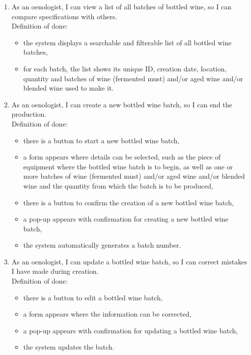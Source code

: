 \begin{enumerate}
	\item As an oenologist, I can view a list of all batches of bottled wine, so I can compare specifications with others.
	\\Definition of done:
	\begin{itemize}
		\item the system displays a searchable and filterable list of all bottled wine batches,
		\item for each batch, the list shows its unique ID, creation date, location, quantity and batches of wine (fermented must) and/or aged wine and/or blended wine used to make it.
	\end{itemize}
	\item As an oenologist, I can create a new bottled wine batch, so I can end the production.
	\\Definition of done:
	\begin{itemize}
		\item there is a button to start a new bottled wine batch,
		\item a form appears where details can be selected, such as the piece of equipment where the bottled wine batch is to begin, as well as one or more batches of wine (fermented must) and/or aged wine and/or blended wine and the quantity from which the batch is to be produced,
		\item there is a button to confirm the creation of a new bottled wine batch,
		\item a pop-up appears with confirmation for creating a new bottled wine batch,
		\item the system automatically generates a batch number.
	\end{itemize}
	\item As an oenologist, I can update a bottled wine batch, so I can correct mistakes I have made during creation.
	\\Definition of done:
	\begin{itemize}
		\item there is a button to edit a bottled wine batch,
		\item a form appears where the information can be corrected,
		\item a pop-up appears with confirmation for updating a bottled wine batch,
		\item the system updates the batch.
	\end{itemize}

\end{enumerate}
